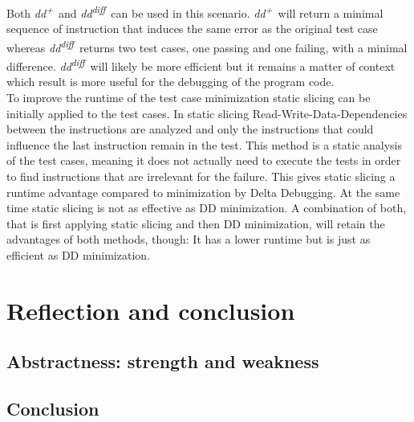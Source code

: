 \documentclass[a4paper,UKenglish]{lipics-v2018}
\newcommand{\ddp}{\textit{dd\textsuperscript{+}}}
\newcommand{\dddiff}{\textit{dd\textsuperscript{diff}}}
\begin{document}
Both \ddp\ and \dddiff\ can be used in this scenario. \ddp\ will return a minimal sequence of instruction that induces the same error as the original test case whereas \dddiff\ returns two test cases, one passing and one failing, with a minimal difference. \dddiff\ will likely be more efficient %
 but it remains a matter of context which result is more useful for the debugging of the program code.\\

To improve the runtime of the test case minimization static slicing can be initially applied to the test cases. In static slicing Read-Write-Data-Dependencies between the instructions are analyzed and only the instructions that could influence the last instruction remain in the test. This method is a static analysis of the test cases, meaning it does not actually need to execute the tests in order to find instructions that are irrelevant for the failure. This gives static slicing a runtime advantage compared to minimization by Delta Debugging. At the same time static slicing is not as effective as DD minimization. A combination of both, that is first applying static slicing and then DD minimization, will retain the advantages of both methods, though: It has a lower runtime but is just as efficient as DD minimization. %

\section{Reflection and conclusion}
\subsection{Abstractness: strength and weakness}
\subsection{Conclusion}
\end{document}
